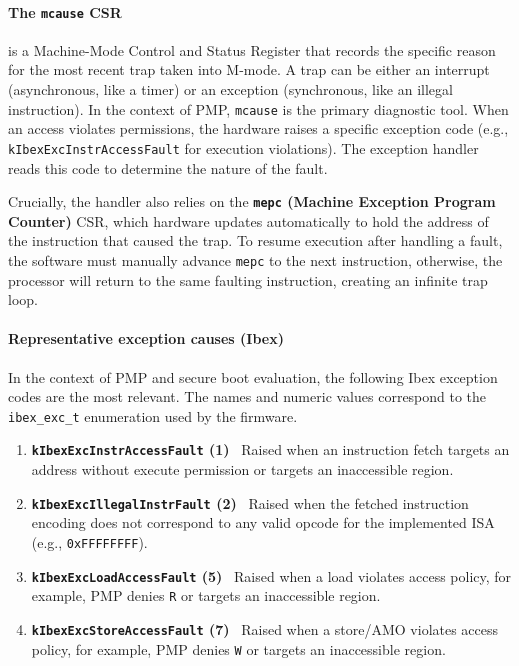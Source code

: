 \documentclass[10pt,a4paper,twocolumn,twoside]{article}
\begin{document}
\paragraph{The \texttt{mcause} CSR} is a Machine-Mode Control and Status Register that records the specific reason for the most recent trap taken into M-mode. A trap can be either an interrupt (asynchronous, like a timer) or an exception (synchronous, like an illegal instruction). In the context of PMP, \texttt{mcause} is the primary diagnostic tool. When an access violates permissions, the hardware raises a specific exception code (e.g., \texttt{kIbexExcInstrAccessFault} for execution violations). The exception handler reads this code to determine the nature of the fault. 

Crucially, the handler also relies on the \textbf{\texttt{mepc} (Machine Exception Program Counter)} CSR, which hardware updates automatically to hold the address of the instruction that caused the trap. To resume execution after handling a fault, the software must manually advance \texttt{mepc} to the next instruction, otherwise, the processor will return to the same faulting instruction, creating an infinite trap loop.

\paragraph{Representative exception causes (Ibex)}
In the context of PMP and secure boot evaluation, the following Ibex exception codes are the most relevant. The names and numeric values correspond to the \texttt{ibex\_exc\_t} enumeration used by the firmware.


\begin{enumerate}
\item \textbf{\texttt{kIbexExcInstrAccessFault} (1)} \
Raised when an instruction fetch targets an address without execute permission or targets an inaccessible region.

\item \textbf{\texttt{kIbexExcIllegalInstrFault} (2)} \
Raised when the fetched instruction encoding does not correspond to any valid opcode for the implemented ISA (e.g., \texttt{0xFFFFFFFF}). 

\item \textbf{\texttt{kIbexExcLoadAccessFault} (5)} \
Raised when a load violates access policy, for example, PMP denies \texttt{R} or targets an inaccessible region.

\item \textbf{\texttt{kIbexExcStoreAccessFault} (7)} \
Raised when a store/AMO violates access policy, for example, PMP denies \texttt{W} or targets an inaccessible region.
\end{enumerate}
\end{document}
